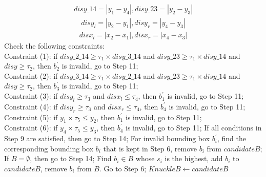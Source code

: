 \begin{algorithm}[ht!]
\begin{algorithmic}[1]
{\begin{equation}
                \label{equation-3}
            \end{equation}
            \vspace{-0.2in}
            \begin{equation}
                \begin{aligned}
                    disy\_14 = \left|y_1-y_4\right|, disy\_23=\left|y_2-y_3\right|
                \end{aligned}
                \label{equation-4}
            \end{equation}
            \vspace{-0.2in}
            \begin{equation}
                \begin{aligned}
                    disy_l = \left|y_2-y_1\right|, disy_r=\left|y_4-y_3\right|
                \end{aligned}
                \label{equation-5}
            \end{equation}
            \vspace{-0.2in}
            \begin{equation}
                \begin{aligned}
                    disx_l = \left|x_2-x_1\right|, disx_r=\left|x_4-x_3\right|
                \end{aligned}
                \label{equation-6}
            \end{equation}}
        \vspace{-0.2in}
        \STATE Check the following constraints:\\
        \footnotesize{
        Constraint (1): if $disy\_2\_14 \ge \tau_1 \times disy\_3\_14$ and $disy\_23 \ge \tau_1 \times disy\_14$ and $disy \ge \tau_2$, then $b_2^{'}$ is invalid, go to Step 11;\\
        Constraint (2): if $disy\_3\_14 \ge  \tau_1 \times disy\_2\_14$ and $disy\_23 \ge \tau_1 \times disy\_14$ and $disy \ge \tau_2$, then $b_3^{'}$ is invalid, go to Step 11;\\
        Constraint (3): if $disy_l \ge \tau_3$ and $disx_l \le \tau_4$, then $b_1^{'}$ is invalid, go to Step 11;\\
        Constraint (4): if $disy_r \ge \tau_3$ and $disx_r \le \tau_4$, then $b_4^{'}$ is invalid, go to Step 11;\\
        Constraint (5): if $y_1 \times \tau_5 \le y_2$, then $b_1^{'}$ is invalid, go to Step 11;\\
        Constraint (6): if $y_4 \times \tau_5 \le y_3$, then $b_4^{'}$ is invalid, go to Step 11;}
        \STATE If all conditions in Step 9 are satisfied, then go to Step 14;
        \STATE For invalid bounding box $b_i^{'}$, find the corresponding bounding box $b_i$ that is kept in Step 6, remove $b_i$ from $candidateB$;
        \STATE If $B = \emptyset$, then go to Step 14;
        \STATE Find $b_i \in B$ whose $s_i$ is the highest, add $b_i$ to $candidateB$, remove $b_i$ from $B$. Go to Step 6;
        \STATE $KnuckleB \gets candidateB$

    \end{algorithmic}
    \label{algorithm-1}
\end{algorithm}

